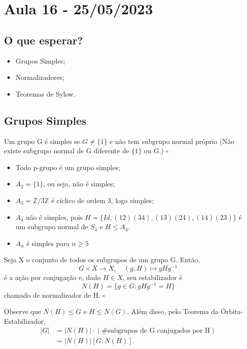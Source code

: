 \documentclass[Algebra/algebra_notes.tex]{subfiles}
\begin{document}
\section{Aula 16 - 25/05/2023}
\subsection{O que esperar?}
\begin{itemize}
	\item Grupos Simples;
	\item Normalizadores;
	\item Teoremas de Sylow.
\end{itemize}
\subsection{Grupos Simples}
\begin{def*}
	Um grupo G é simples se \(G\neq\{1\}\) e não tem subgrupo normal próprio (Não
	existe subgrupo normal de G diferente de \(\{1\}\) ou G.) \(\square\)
\end{def*}
\begin{example*}
	\begin{itemize}
		\item Todo p-grupo é um grupo simples;
		\item \(A_{2}=\{1\}\), ou seja, não é simples;
		\item \(A_{3} = \mathbb{Z}/3 \mathbb{Z}\) é cíclico de ordem 3, logo simples;
		\item \(A_{4}\) não é simples, pois \(H = \{Id, (12)(34), (13)(24), (14)(23)\}\)
		      é um subgrupo normal de \(S_{4}\) e \(H\leq A_{4}.\)
		\item \(A_{n}\) é simples para \(n\geq 5\)
	\end{itemize}
\end{example*}
\begin{def*}
	Seja X o conjunto de todos os subgrupos de um grupo G. Então,
	\[
		G\times X\rightarrow X,\quad (g, H)\mapsto gHg^{-1}
	\]
	é a ação por conjugação e, dado \(H\in X\), seu estabilizador é
	\[
		N(H) = \{g\in G: gHg^{-1}=H\}
	\]
	chamado de normalizador de H. \(\square\)
\end{def*}
Observe que \(N(H)\leq G\) e \(H\leq N(G)\). Além disso, pelo Teorema da Órbita-Estabilizador,
\begin{align*}
	|G| & = |N(H)|\cdot (\#\text{subgrupos de G conjugados por H}) \\
	    & = |N(H)|[G:N(H)].
\end{align*}
\end{document}
